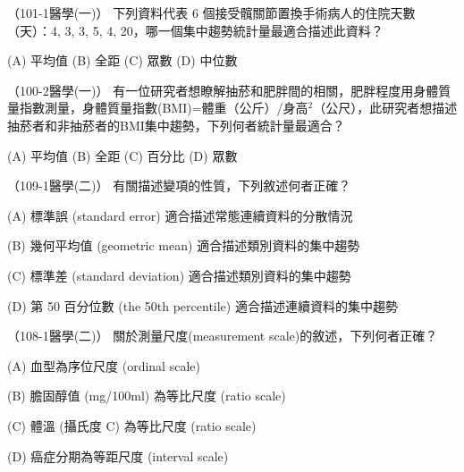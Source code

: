     \begin{docexam}{（101-1醫學(一)）}
        下列資料代表 6 個接受髖關節置換手術病人的住院天數（天）：4, 3, 3, 5, 4, 20，哪一個集中趨勢統計量最適合描述此資料？
        
        (A) 平均值  (B) 全距  (C) 眾數  (D) 中位數
    \end{docexam}

    \begin{docexam}{（100-2醫學(一)）}
        有一位研究者想瞭解抽菸和肥胖間的相關，肥胖程度用身體質量指數測量，身體質量指數(BMI)=體重（公斤）/身高$^2$（公尺），此研究者想描述抽菸者和非抽菸者的BMI集中趨勢，下列何者統計量最適合？
        
        (A) 平均值  (B) 全距  (C) 百分比  (D) 眾數
    \end{docexam}

    \begin{docexam}{（109-1醫學(二)）}
        有關描述變項的性質，下列敘述何者正確？
        
        (A) 標準誤 (standard error) 適合描述常態連續資料的分散情況
        
        (B) 幾何平均值 (geometric mean) 適合描述類別資料的集中趨勢
        
        (C) 標準差 (standard deviation) 適合描述類別資料的集中趨勢
        
        (D) 第 50 百分位數 (the 50th percentile) 適合描述連續資料的集中趨勢
    \end{docexam}

    \begin{docexam}{（108-1醫學(二)）}
        關於測量尺度(measurement scale)的敘述，下列何者正確？
        
        (A) 血型為序位尺度 (ordinal scale)
        
        (B) 膽固醇值 (mg/100ml) 為等比尺度 (ratio scale) 
        
        (C) 體溫 (攝氏度 C) 為等比尺度 (ratio scale)
        
        (D) 癌症分期為等距尺度 (interval scale)
    \end{docexam}